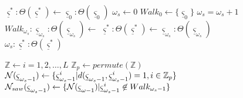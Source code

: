 \begin{figure*}[t!]
\begin{minipage}[t]{0.49\linewidth}
\label{fg_global_search_b}
\begin{algorithmic}[1]
    \STATE ${\underline \varsigma^*}\!:\!\Theta({\underline \varsigma^*}) \gets {\underline \varsigma}_0\!:\!\Theta({\underline \varsigma}_0)$
\ENDIF
\STATE $\omega_{s} \gets 0$     
\STATE $Walk_{0} \gets \{ {\underline \varsigma}_0 \}$
    \ENDIF
    \STATE $\omega_{s}=\omega_{s}+1$
    \STATE $Walk_{\omega_{s}}\!:\!{\underline \varsigma}_{\omega_{s}}\!:\!\Theta({\underline \varsigma}_{\omega_{s}}) \gets$
       \STATE ${\underline \varsigma^*}\!:\!\Theta({\underline \varsigma^*}) \gets {\underline \varsigma_{\omega_{s}}}\!:\!\Theta({\underline \varsigma}_{\omega_{s}})$
     \ENDIF
\ENDWHILE
{} $\omega_{s}\!:\!{\underline \varsigma^*}\!:\!\Theta({\underline \varsigma^*})$
\ENDPROCEDURE
\end{algorithmic}
\end{minipage}
\begin{minipage}[t]{0.49\linewidth}
\label{fg_global_search_c}
\begin{algorithmic}[1]
\STATE $\mathbb{Z} \gets i = 1,2, \ldots ,L $ 
\STATE $\mathbb{Z}_p \gets permute(\mathbb{Z}) $ 
\STATE ${\cal N} ({\underline \varsigma}_{\omega_{s} -1}) \gets  \{{\underline \varsigma}_{\omega_{s} -1}^i | d({\underline \varsigma}_{\omega_{s} -1}, {\underline \varsigma}_{\omega_{s} -1}^i ) = 1, i \in \mathbb{Z}_p\}$ 
\STATE ${\cal N}_{saw} ({\underline \varsigma}_{\omega_{s} -1}) \gets  \{ {\cal N} ({\underline \varsigma}_{\omega -1}) |
                      {\underline \varsigma}_{\omega_{s} -1}^i \not\in  Walk_{\omega_{s} -1}\}$

\end{algorithmic}
\end{minipage}
\end{figure*}
